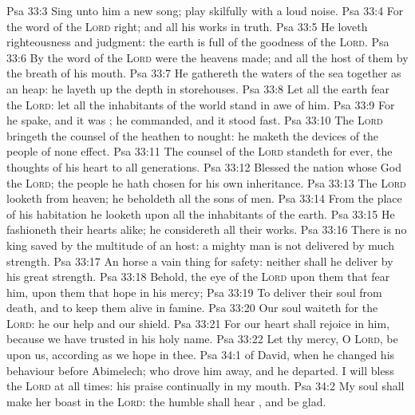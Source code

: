 \vs Psa 33:3 Sing unto him a new song; play skilfully with a loud noise.
\vs Psa 33:4 For the word of the \textsc{Lord}  right; and all his works  in truth.
\vs Psa 33:5 He loveth righteousness and judgment: the earth is full of the goodness of the \textsc{Lord}.
\vs Psa 33:6 By the word of the \textsc{Lord} were the heavens made; and all the host of them by the breath of his mouth.
\vs Psa 33:7 He gathereth the waters of the sea together as an heap: he layeth up the depth in storehouses.
\vs Psa 33:8 Let all the earth fear the \textsc{Lord}: let all the inhabitants of the world stand in awe of him.
\vs Psa 33:9 For he spake, and it was ; he commanded, and it stood fast.
\vs Psa 33:10 The \textsc{Lord} bringeth the counsel of the heathen to nought: he maketh the devices of the people of none effect.
\vs Psa 33:11 The counsel of the \textsc{Lord} standeth for ever, the thoughts of his heart to all generations.
\vs Psa 33:12 Blessed  the nation whose God  the \textsc{Lord};  the people  he hath chosen for his own inheritance.
\vs Psa 33:13 The \textsc{Lord} looketh from heaven; he beholdeth all the sons of men.
\vs Psa 33:14 From the place of his habitation he looketh upon all the inhabitants of the earth.
\vs Psa 33:15 He fashioneth their hearts alike; he considereth all their works.
\vs Psa 33:16 There is no king saved by the multitude of an host: a mighty man is not delivered by much strength.
\vs Psa 33:17 An horse  a vain thing for safety: neither shall he deliver  by his great strength.
\vs Psa 33:18 Behold, the eye of the \textsc{Lord}  upon them that fear him, upon them that hope in his mercy;
\vs Psa 33:19 To deliver their soul from death, and to keep them alive in famine.
\vs Psa 33:20 Our soul waiteth for the \textsc{Lord}: he  our help and our shield.
\vs Psa 33:21 For our heart shall rejoice in him, because we have trusted in his holy name.
\vs Psa 33:22 Let thy mercy, O \textsc{Lord}, be upon us, according as we hope in thee.
\vs Psa 34:1  of David, when he changed his behaviour before Abimelech; who drove him away, and he departed. I will bless the \textsc{Lord} at all times: his praise  continually  in my mouth.
\vs Psa 34:2 My soul shall make her boast in the \textsc{Lord}: the humble shall hear , and be glad.
